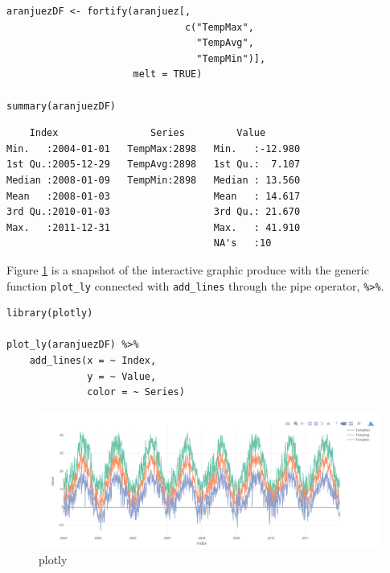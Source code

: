 \documentclass[smallroyalvopaper]{memoir}
\begin{document}

\lstset{language=r,label= ,caption= ,captionpos=b,numbers=none}
\begin{lstlisting}
aranjuezDF <- fortify(aranjuez[,
                               c("TempMax",
                                 "TempAvg",
                                 "TempMin")],
                      melt = TRUE)

summary(aranjuezDF)
\end{lstlisting}

\begin{verbatim}
    Index                Series         Value        
Min.   :2004-01-01   TempMax:2898   Min.   :-12.980  
1st Qu.:2005-12-29   TempAvg:2898   1st Qu.:  7.107  
Median :2008-01-09   TempMin:2898   Median : 13.560  
Mean   :2008-01-03                  Mean   : 14.617  
3rd Qu.:2010-01-03                  3rd Qu.: 21.670  
Max.   :2011-12-31                  Max.   : 41.910  
                                    NA's   :10
\end{verbatim}


Figure \ref{fig:plotly} is a snapshot of the interactive graphic produce
with the generic function \texttt{plot\_ly} connected with \texttt{add\_lines} through
the pipe operator, \texttt{\%>\%}.


\lstset{language=r,label= ,caption= ,captionpos=b,numbers=none}
\begin{lstlisting}
library(plotly)

plot_ly(aranjuezDF) %>%
    add_lines(x = ~ Index,
              y = ~ Value,
              color = ~ Series)

\end{lstlisting}

\begin{figure}[htbp]
\centering
\includegraphics[width=.9\linewidth]{figs/plotly_aranjuez.png}
\caption{plotly \label{fig:plotly}}
\end{figure}
\end{document}
